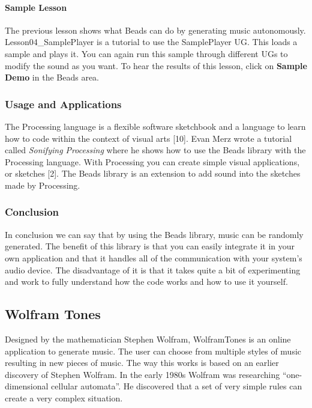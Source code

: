 \documentclass[12pt]{article}
\begin{document}
\paragraph{Sample Lesson}

The previous lesson shows what Beads can do by generating music autonomously. Lesson04\_SamplePlayer is a tutorial to use the SamplePlayer UG. This loads a sample and plays it. You can again run this sample through different UGs to modify the sound as you want. To hear the results of this lesson, click on \textbf{Sample Demo} in the Beads area. 

\subsubsection{Usage and Applications}

The Processing language is a flexible software sketchbook and a language to learn how to code within the context of visual arts [10]. Evan Merz wrote a tutorial called \textit{Sonifying Processing} where he shows how to use the Beads library with the Processing language. With Processing you can create simple visual applications, or sketches [2]. The Beads library is an extension to add sound into the sketches made by Processing.

\subsubsection{Conclusion}

In conclusion we can say that by using the Beads library, music can be randomly generated. The benefit of this library is that you can easily integrate it in your own application and that it handles all of the communication with your system's audio device. The disadvantage of it is that it takes quite a bit of experimenting and work to fully understand how the code works and how to use it yourself.

\subsection{Wolfram Tones}

Designed by the mathematician Stephen Wolfram, WolframTones is an online application to generate music. The user can choose from multiple styles of music resulting in new pieces of music. The way this works is based on an earlier discovery of Stephen Wolfram. In the early 1980s Wolfram was researching ``one-dimensional cellular automata''. He discovered that a set of very simple rules can create a very complex situation. 
\newline
\end{document}

